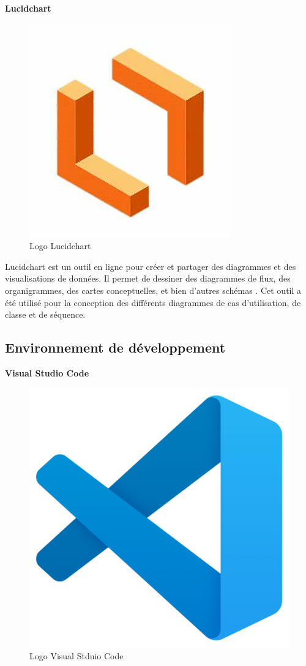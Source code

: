 \large 
\textbf{Lucidchart}
\begin{figure}[htbp]
   \centering
   \includegraphics[scale=0.2]{Images/lucid.jpeg} 
   \caption{Logo Lucidchart\cite{LucidChart}}
   \label{fig:lucid}
\end{figure}

Lucidchart est un outil en ligne pour créer et partager des 
diagrammes et des visualisations de données. Il permet de 
dessiner des diagrammes de flux, des organigrammes, des cartes 
conceptuelles, et bien d'autres schémas \cite{LucidChart}. Cet outil a été utilisé pour
la conception des différents diagrammes de cas d'utilisation, de classe et de séquence.

\subsection{Environnement de développement}
\large 
\textbf{Visual Studio Code}

\begin{figure}[htbp]
   \centering
   \includegraphics[scale=0.06]{Images/vs.png} 
   \caption{Logo Visual Stduio Code\cite{vsCode}}
   \label{fig:vscode}
\end{figure}

